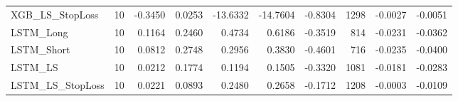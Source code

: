 \begin{tabular}{llrrrrrrrr}
\cline{1-10}
XGB\_LS\_StopLoss & 10 & -0.3450 & 0.0253 & -13.6332 & -14.7604 & -0.8304 & 1298 & -0.0027 & -0.0051 \\
\cline{1-10}
LSTM\_Long & 10 & 0.1164 & 0.2460 & 0.4734 & 0.6186 & -0.3519 & 814 & -0.0231 & -0.0362 \\
\cline{1-10}
LSTM\_Short & 10 & 0.0812 & 0.2748 & 0.2956 & 0.3830 & -0.4601 & 716 & -0.0235 & -0.0400 \\
\cline{1-10}
LSTM\_LS & 10 & 0.0212 & 0.1774 & 0.1194 & 0.1505 & -0.3320 & 1081 & -0.0181 & -0.0283 \\
\cline{1-10}
LSTM\_LS\_StopLoss & 10 & 0.0221 & 0.0893 & 0.2480 & 0.2658 & -0.1712 & 1208 & -0.0003 & -0.0109 \\
\cline{1-10}
\bottomrule
\end{tabular}
